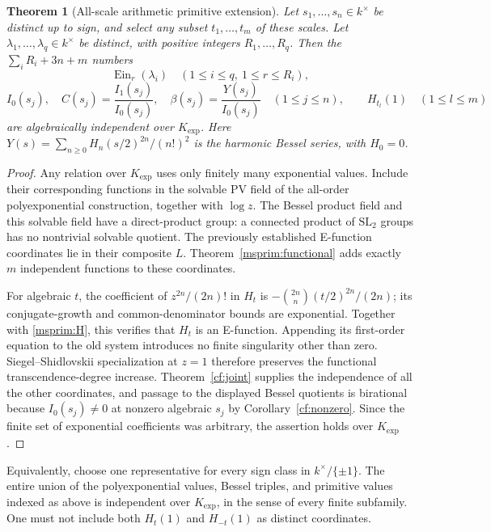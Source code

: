 \documentclass[11pt]{article}
\newtheorem{theorem}{Theorem}[section]
\theoremstyle{definition}
\theoremstyle{remark}
\newcommand{\Ein}{\operatorname{Ein}}
\begin{document}
\begin{theorem}[All-scale arithmetic primitive extension]
\label{msprim:values}
Let $s_1,\ldots,s_n\in k^\times$ be distinct up to sign, and select
any subset $t_1,\ldots,t_m$ of these scales. Let
$\lambda_1,\ldots,\lambda_q\in k^\times$ be distinct, with positive
integers $R_1,\ldots,R_q$. Then the
$\sum_iR_i+3n+m$ numbers
\[
 \Ein_r(\lambda_i)\quad(1\le i\le q,\ 1\le r\le R_i),
\]
\[
 I_0(s_j),\quad C(s_j)=\frac{I_1(s_j)}{I_0(s_j)},\quad
 \beta(s_j)=\frac{Y(s_j)}{I_0(s_j)}\quad(1\le j\le n),
 \qquad H_{t_l}(1)\quad(1\le l\le m)
\]
are algebraically independent over $K_{\exp}$.
Here $Y(s)=\sum_{n\ge0}H_n(s/2)^{2n}/(n!)^2$ is the harmonic
Bessel series, with $H_0=0$.
\end{theorem}
\begin{proof}
Any relation over $K_{\exp}$ uses only finitely many exponential
values. Include their corresponding functions in the solvable PV
field of the all-order polyexponential construction, together with
$\log z$. The Bessel product field and this solvable field have a
direct-product group: a connected product of $\mathrm{SL}_2$ groups
has no nontrivial solvable quotient. The previously established
E-function coordinates lie in their composite $L$.
Theorem~\ref{msprim:functional} adds exactly $m$ independent
functions to these coordinates.

For algebraic $t$, the coefficient of $z^{2n}/(2n)!$ in $H_t$ is
$-\binom{2n}{n}(t/2)^{2n}/(2n)$; its conjugate-growth and
common-denominator bounds are exponential. Together with
\eqref{msprim:H}, this verifies that $H_t$ is an E-function.
Appending its first-order equation to the old system introduces no
finite singularity other than zero. Siegel--Shidlovskii specialization
at $z=1$ therefore preserves the functional transcendence-degree
increase. Theorem~\ref{cf:joint} supplies the independence of all the other
coordinates, and passage to the displayed Bessel quotients is
birational because $I_0(s_j)\ne0$ at nonzero algebraic $s_j$
by Corollary~\ref{cf:nonzero}.
Since the finite set of exponential coefficients was arbitrary,
the assertion holds over $K_{\exp}$.
\end{proof}

Equivalently, choose one representative for every sign class in
$k^\times/\{\pm1\}$. The entire union of the polyexponential values,
Bessel triples, and primitive values indexed as above is independent
over $K_{\exp}$, in the sense of every finite subfamily. One must not
include both $H_t(1)$ and $H_{-t}(1)$ as distinct coordinates.
\end{document}
